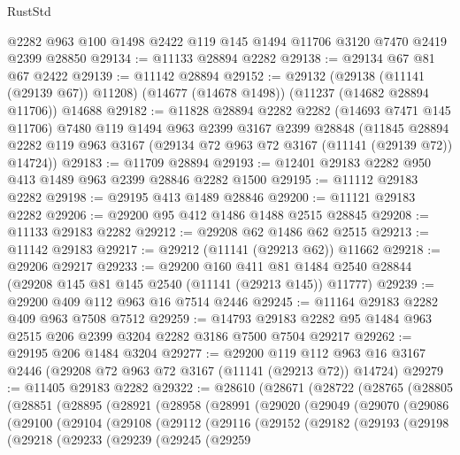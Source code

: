 \begin{lexlean}{RustStd}
\begin{coremodule}
    @2282
    @963
    @100
    @1498
    @2422
    @119
    @145
    @1494
    @11706
    @3120
    @7470
    @2419
    @2399
    @28850
@29134 := @11133 @28894 @2282
@29138 := @29134 @67 @81 @67 @2422
@29139 := @11142 @28894
@29152 := @29132
    (@29138 (@11141 (@29139 @67)) @11208)
    (@14677 (@14678 @1498))
    (@11237 (@14682 @28894 @11706))
    @14688
@29182 := @11828
    @28894
    @2282
    @2282
    (@14693 @7471 @145 @11706)
    @7480
    @119
    @1494
    @963
    @2399
    @3167
    @2399
    @28848
    (@11845 @28894 @2282 @119 @963 @3167 (@29134 @72 @963 @72 @3167 (@11141 (@29139 @72)) @14724))
@29183 := @11709 @28894
@29193 := @12401 @29183 @2282 @950 @413 @1489 @963 @2399 @28846 @2282 @1500
@29195 := @11112 @29183 @2282
@29198 := @29195 @413 @1489 @28846
@29200 := @11121 @29183 @2282
@29206 := @29200 @95 @412 @1486 @1488 @2515 @28845
@29208 := @11133 @29183 @2282
@29212 := @29208 @62 @1486 @62 @2515
@29213 := @11142 @29183
@29217 := @29212 (@11141 (@29213 @62)) @11662
@29218 := @29206 @29217
@29233 := @29200
    @160
    @411
    @81
    @1484
    @2540
    @28844
    (@29208 @145 @81 @145 @2540 (@11141 (@29213 @145)) @11777)
@29239 := @29200 @409 @112 @963 @16 @7514 @2446
@29245 := @11164 @29183 @2282 @409 @963 @7508 @7512
@29259 := @14793 @29183 @2282 @95 @1484 @963 @2515 @206 @2399 @3204 @2282 @3186 @7500 @7504 @29217
@29262 := @29195 @206 @1484 @3204
@29277 := @29200
    @119
    @112
    @963
    @16
    @3167
    @2446
    (@29208 @72 @963 @72 @3167 (@11141 (@29213 @72)) @14724)
@29279 := @11405 @29183 @2282
@29322 := @28610
    (@28671
      (@28722
        (@28765
          (@28805
            (@28851
              (@28895
                (@28921
                  (@28958
                    (@28991
                      (@29020
                        (@29049
                          (@29070
                            (@29086
                              (@29100
                                (@29104
                                  (@29108
                                    (@29112
                                      (@29116
                                        (@29152
                                          (@29182
                                            (@29193
                                              (@29198
                                                (@29218
                                                  (@29233
                                                    (@29239
                                                      (@29245
                                                        (@29259

\end{coremodule}
\end{lexlean}
